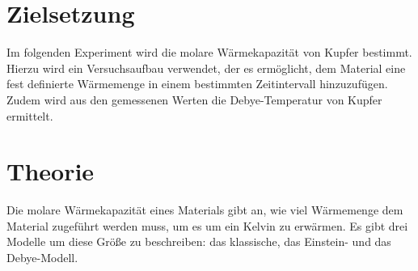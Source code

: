 \section{Zielsetzung}
Im folgenden Experiment wird die molare Wärmekapazität von Kupfer bestimmt.
Hierzu wird ein Versuchsaufbau verwendet, der es ermöglicht, dem Material eine fest definierte Wärmemenge in einem bestimmten Zeitintervall hinzuzufügen.
Zudem wird aus den gemessenen Werten die Debye-Temperatur von Kupfer ermittelt.

\section{Theorie}
\label{sec:Theorie}



Die molare Wärmekapazität eines Materials gibt an, wie viel Wärmemenge dem Material zugeführt werden muss, um es um ein Kelvin zu erwärmen.
Es gibt drei Modelle um diese Größe zu beschreiben: das klassische, das Einstein- und das Debye-Modell.

